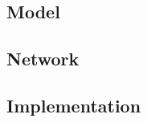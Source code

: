 \subsection{Model}
\label{sec:methods_model}


\subsection{Network}
\label{sec:methods_network}


\subsection{Implementation}
\label{sec:methods_implementation}


